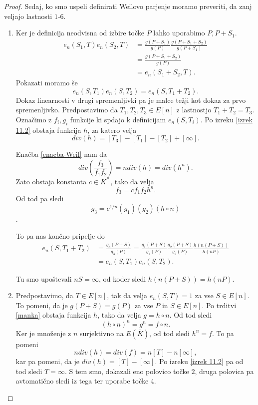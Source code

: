 \documentclass[12pt,a4paper,twoside]{article}
\theoremstyle{definition} %
\theoremstyle{plain} %
\numberwithin{equation}{section}  %
\begin{document}
\begin{proof}
Sedaj, ko smo uspeli definirati Weilovo parjenje moramo preveriti, da zanj veljajo lastnosti $1$-$6$.
\begin{enumerate}
\item Ker je definicija neodvisna od izbire točke $P$ lahko uporabimo $P,P+S_1$.
\begin{align}
e_n(S_1,T)e_n(S_2,T) &{}= \frac{g(P+S_1)}{g(P)} \frac{g(P+S_1+S_2)}{g(P+S_1)} \nonumber \\
&{} = \frac{g(P+S_1+S_2)}{g(P)} \nonumber \\
&{} = e_n(S_1+S_2,T). \nonumber
\end{align}
Pokazati moramo še
$$e_n(S,T_1)e_n(S,T_2) = e_n(S,T_1+T_2).$$
Dokaz linearnosti v drugi spremenljivki pa je malce težji kot dokaz za prvo spremenljivko.
Predpostavimo da $T_1,T_2,T_3 \in E[n]$ z lastnostjo $T_1 +T_2 = T_3.$ Označimo z $f_i,g_i$ funkcije ki spdajo k definicijam $e_n(S,T_i)$.
Po izreku \ref{izrek 11.2} obstaja funkcija $h$, za katero velja
$$div(h) = [T_3]-[T_1]-[T_2] + [\infty].$$

Enačba \ref{enacba-Weil} nam da
$$div \left(  \frac{f_3}{f_1f_2}\right) = n div(h) = div(h^n).$$
Zato obstaja konstanta $c \in \overline{K}^{\times}$, tako da velja
$$f_3 = cf_1f_2h^n.$$
Od tod pa sledi
$$g_3 = c^{1/n}(g_1)(g_2)(h \circ n)$$.

To pa nas končno pripelje do
\begin{align}
e_n(S,T_1+T_2) &{}= \frac{g_3(P+S)}{g_3(P)} = \frac{g_1(P+S)}{g_1(P)} \frac{g_2(P+S)}{g_2(P)} \frac{h(n(P+S))}{h(nP)} \nonumber \\
&{} = e_n(S,T_1)e_n(S,T_2). \nonumber
\end{align}

Tu smo upoštevali $nS = \infty$, od koder sledi $h(n(P+S)) = h(nP)$.

\item Predpostavimo, da $T \in E[n]$, tak da velja $e_n(S,T)=1$ za vse $S \in E[n]$. To pomeni, da je $g(P+S) = g(P)$ za vse $P$ in $S \in E[n]$. Po trditvi \ref{manka}%
obstaja funkcija $h$, tako da velja $g = h \circ n$. Od tod sledi 
$$(h \circ n) ^n = g^n = f \circ n.$$
Ker je množenje z $n$ surjektivno na $E(\overline{K})$, od tod sledi $h^n = f$. %
To pa pomeni
$$ndiv(h) = div(f) = n[T]-n[\infty],$$
kar pa pomeni, da je $div(h) = [T] - [\infty]$. Po izreku \ref{izrek 11.2} pa od tod sledi $T = \infty$. S tem smo, dokazali eno polovico točke $2$, druga polovica pa avtomatično sledi iz tega ter uporabe točke $4$.


\end{enumerate}
\end{proof}
\end{document}
